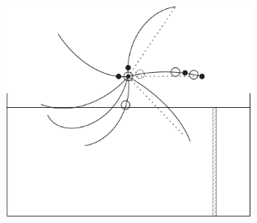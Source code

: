 \pend
\newpage
\pstart
\noindent
\centering
\includegraphics[trim = 0mm -2mm 0mm 0mm, clip, width=0.6\textwidth]{images/LH035,02,01_273-d7.pdf}\\
\pend
